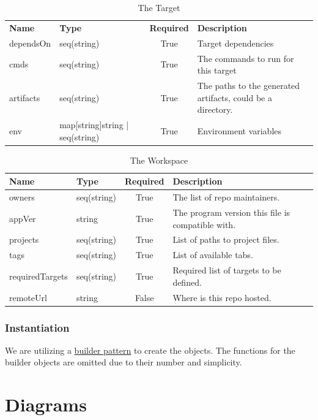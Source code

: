 \documentclass[11pt]{article}
\begin{document}
\begin{table}[h!]
  \centering
  \begin{tabular}[h!]{l | p{3cm} | c | p{7cm}}
    \textbf{Name} & \textbf{Type} & \textbf{Required} & \textbf{Description}\\
    dependsOn & seq(string) & True & Target dependencies\\
    \hline
    cmds & seq(string) & True & The commands to run for this target\\
    \hline
    artifacts & seq(string) & True & The paths to the generated artifacts, could
                                     be a directory.\\
    \hline
    env & map[string]string | seq(string) & True & Environment variables
  \end{tabular}
  \caption{The Target}
  \label{table:target}
\end{table}

\begin{table}[h!]
  \centering
  \begin{tabular}[h!]{l | l | c | l}
    \textbf{Name} & \textbf{Type} & \textbf{Required} & \textbf{Description}\\
    \hline
    owners & seq(string) & True & The list of repo maintainers.\\
    \hline
    appVer & string & True & The program version this file is compatible with.\\
    \hline
    projects & seq(string) & True & List of paths to project files.\\
    \hline
    tags & seq(string) & True & List of available tabs.\\
    \hline
    requiredTargets & seq(string) & True & Required list of targets to be
                                           defined.\\
    \hline
    remoteUrl & string & False & Where is this repo hosted.
  \end{tabular}
  \caption{The Workspace}
  \label{table:workspace}
\end{table}

\subsubsection{Instantiation}
We are utilizing a
\href{https://en.wikipedia.org/wiki/Builder\_pattern}{builder pattern} to
create the objects. The functions for the builder objects are omitted due to
their number and simplicity.
\section{Diagrams}
\label{sec:diagrams}
\end{document}
